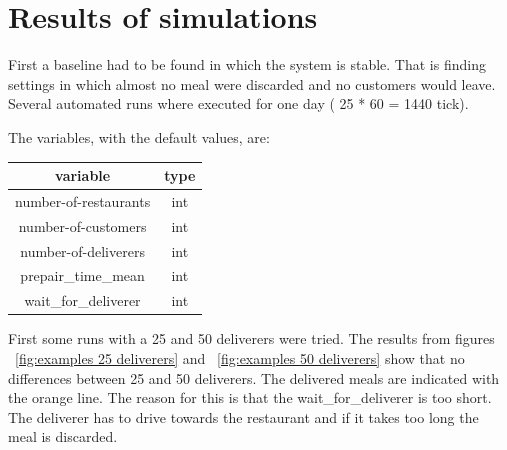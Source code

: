 \section{Results of simulations}\label{sec:results-of-simulations}
First a baseline had to be found in which the system is stable.
That is finding settings in which almost no meal were discarded and no customers would leave.
Several automated runs where executed for one day ( 25 * 60 = 1440 tick).

The variables, with the default values, are:

\begin{center}
    \begin{tabular}{ |c|c| }
        \hline
        variable              & type \\
        \hline
        \hline
        number-of-restaurants & int  \\
        \hline
        number-of-customers   & int  \\
        \hline
        number-of-deliverers  & int  \\
        \hline
        prepair\_time\_mean   & int  \\
        \hline
        wait\_for\_deliverer  & int  \\
        \hline
    \end{tabular}
\end{center}

First some runs with a 25 and 50 deliverers were tried.
The results from figures ~\ref{fig:examples 25 deliverers} and ~\ref{fig:examples 50 deliverers} show that no differences between
25 and 50 deliverers.
The delivered meals are indicated with the orange line.
The reason for this is that the wait\_for\_deliverer is too short.
The deliverer has to drive towards the restaurant and if it takes too long the meal is discarded.

